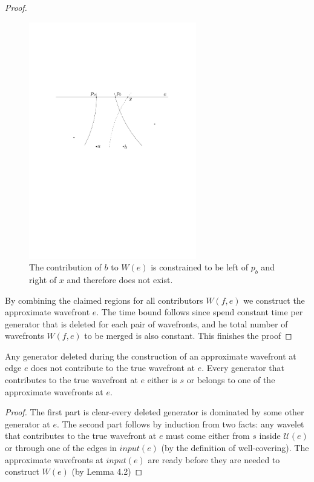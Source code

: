 \begin{proof}
    \begin{figure}[H]
	\centering
	\includegraphics[width=0.65\textwidth]{figures/contribution.pdf}
	\caption{The contribution of $b$ to $W(e)$ is constrained to be left of $p_b$ 
    		 and right of $x$ and therefore does not exist.}
	\label{fig:artificialwavefront}
	\end{figure}

	By combining the claimed regions for all contributors $W(f,e)$ we construct
	the approximate wavefront $e$. The time bound follows since spend constant
	time per generator that is deleted for each pair of wavefronts, and he total
	number of wavefronts $W(f,e)$ to be merged is also constant. This finishes
	the proof
\end{proof}
\begin{Lemma}
	Any generator deleted during the construction of an approximate wavefront at
	edge $e$ does not contribute to the true wavefront at $e$. Every generator
	that contributes to the true wavefront at $e$ either is $s$ or belongs to
	one of the approximate wavefronts at $e$.
\end{Lemma}
\begin{proof}
	The first part is clear-every deleted generator is dominated by some other
	generator at $e$. The second part follows by induction from two facts: any
	wavelet that contributes to the true wavefront at $e$ must come either from
	$s$ inside $\mathcal{U}(e)$ or through one of the edges in $input(e)$ (by
	the definition of well-covering). The approximate wavefronts at $input(e)$
	are ready before they are needed to construct $W(e)$ (by Lemma 4.2)
\end{proof}

